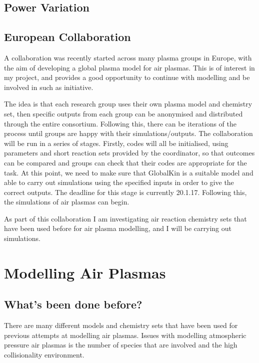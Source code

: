 \documentclass[11pt, oneside]{article}   	%
\begin{document}
\subsection{Power Variation}


\subsection{European Collaboration}
A collaboration was recently started across many plasma groups in Europe, with the aim of developing a global plasma model for air plasmas.
This is of interest in my project, and provides a good opportunity to continue with modelling and be involved in such as initiative.

The idea is that each research group uses their own plasma model and chemistry set, then specific outputs from each group can be anonymised and distributed through the entire consortium.
Following this, there can be iterations of the process until groups are happy with their simulations/outputs.
The collaboration will be run in a series of stages.
Firstly, codes will all be initialised, using parameters and short reaction sets provided by the coordinator, so that outcomes can be compared and groups can check that their codes are appropriate for the task.
At this point, we need to make sure that GlobalKin is a suitable model and able to carry out simulations using the specified inputs in order to give the correct outputs.
The deadline for this stage is currently 20.1.17.
Following this, the simulations of air plasmas can begin.

As part of this collaboration I am investigating air reaction chemistry sets that have been used before for air plasma modelling, and I will be carrying out simulations.


\section{Modelling Air Plasmas}
\subsection{What's been done before?} 
There are many different models and chemistry sets that have been used for previous attempts at modelling air plasmas. 
Issues with modelling atmospheric pressure air plasmas is the number of species that are involved and the high collisionality environment.
\end{document}
